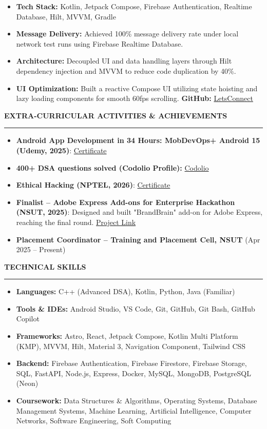\documentclass[10pt]{article}
\newcommand{\resheading}[1]{\vspace{6pt} \noindent \textbf{\large\scshape{#1}} \vspace{3pt} \hrule \vspace{4pt}}
\begin{document}
\begin{itemize}
\begin{itemize}[noitemsep]
        \item \textbf{Tech Stack:} Kotlin, Jetpack Compose, Firebase Authentication, Realtime Database, Hilt, MVVM, Gradle
        \item \textbf{Message Delivery:} Achieved 100\% message delivery rate under local network test runs using Firebase Realtime Database.
        \item \textbf{Architecture:} Decoupled UI and data handling layers through Hilt dependency injection and MVVM to reduce code duplication by 40\%.
        \item \textbf{UI Optimization:} Built a reactive Compose UI utilizing state hoisting and lazy loading components for smooth 60fps scrolling. \textbf{GitHub:} \href{https://github.com/DushyantBhardwaj2/ChattingAppNew}{LetsConnect}
    \end{itemize}
\end{itemize}

\resheading{EXTRA-CURRICULAR ACTIVITIES \& ACHIEVEMENTS}
\begin{itemize}
    \item \textbf{Android App Development in 34 Hours: MobDevOps+ Android 15 (Udemy, 2025)}: \href{https://udemy-certificate.s3.amazonaws.com/pdf/UC-332b5f26-9095-4d67-9ffb-956f05e35ffe.pdf}{Certificate}
    \item \textbf{400+ DSA questions solved (Codolio Profile):} \href{https://codolio.com/profile/Negative_Bhardwaj}{Codolio}
    \item \textbf{Ethical Hacking (NPTEL, 2026)}: \href{https://archive.nptel.ac.in/content/noc/NOC25/SEM2/Ecertificates/106/noc25-cs142/Course/NPTEL25CS142S106540131810478214.pdf}{Certificate}
    \item \textbf{Finalist -- Adobe Express Add-ons for Enterprise Hackathon (NSUT, 2025)}: Designed and built "BrandBrain" add-on for Adobe Express, reaching the final round. \href{https://devpost.com/software/brandbrain}{Project Link}
    \item \textbf{Placement Coordinator -- Training and Placement Cell, NSUT} (Apr 2025 -- Present)
\end{itemize}

\resheading{TECHNICAL SKILLS}
\begin{itemize}
\item \textbf{Languages:} C++ (Advanced DSA), Kotlin, Python, Java (Familiar)
\item \textbf{Tools \& IDEs:} Android Studio, VS Code, Git, GitHub, Git Bash, GitHub Copilot
\item \textbf{Frameworks:} Astro, React, Jetpack Compose, Kotlin Multi Platform (KMP), MVVM, Hilt, Material 3, Navigation Component, Tailwind CSS
\item \textbf{Backend:} Firebase Authentication, Firebase Firestore, Firebase Storage, SQL, FastAPI, Node.js, Express, Docker, MySQL, MongoDB, PostgreSQL (Neon)
\item \textbf{Coursework:} Data Structures \& Algorithms, Operating Systems, Database Management Systems, Machine Learning, Artificial Intelligence, Computer Networks, Software Engineering, Soft Computing
\end{itemize}
\end{document}
